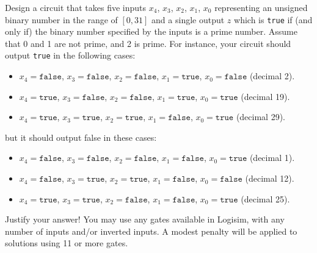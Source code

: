 \item[8] Design  a circuit that  takes five inputs  $x_4$,  $x_3$, $x_2$, $x_1$,  $x_0$
  representing an unsigned binary number in the range of $\left[0,31\right]$ and a single
  output $z$ which is \texttt {true} if (and only if)  the binary number specified by the
  inputs is a prime number. Assume that 0 and 1 are not prime, and 2 is prime.
  For instance, your circuit should output \texttt {true} in the following cases:
  \begin{itemize}                                                                                   
  \item  $x_4 =  \texttt{false}$,  $x_3 =  \texttt{false}$, $x_2  =  \texttt{false}$, $x_1  =
    \texttt{true}$, $x_0 = \texttt{false}$ (decimal 2).
  \item  $x_4 =  \texttt{true}$,  $x_3 =  \texttt{false}$, $x_2  =  \texttt{false}$, $x_1  =
    \texttt{true}$, $x_0 = \texttt{true}$ (decimal 19).
  \item  $x_4 =  \texttt{true}$,  $x_3 =  \texttt{true}$, $x_2  =  \texttt{true}$, $x_1  =
    \texttt{false}$, $x_0 = \texttt{true}$ (decimal 29).
  \end{itemize}
  but it should output false in these cases:                                                        
  \begin{itemize}                                                                                   
  \item  $x_4 =  \texttt{false}$,  $x_3 =  \texttt{false}$, $x_2  =  \texttt{false}$, $x_1  =
    \texttt{false}$, $x_0 = \texttt{true}$ (decimal 1).
  \item  $x_4 =  \texttt{false}$,  $x_3 =  \texttt{true}$, $x_2  =  \texttt{true}$, $x_1  =
    \texttt{false}$, $x_0 = \texttt{false}$ (decimal 12).
  \item  $x_4 =  \texttt{true}$,  $x_3 =  \texttt{true}$, $x_2  =  \texttt{false}$, $x_1  =
    \texttt{false}$, $x_0 = \texttt{true}$ (decimal 25).
  \end{itemize}                                                                                     
  Justify your answer! You may use any gates available in Logisim, with any number of inputs
  and/or inverted inputs. A modest penalty will be applied to solutions using 11 or more gates.
  \newpage
